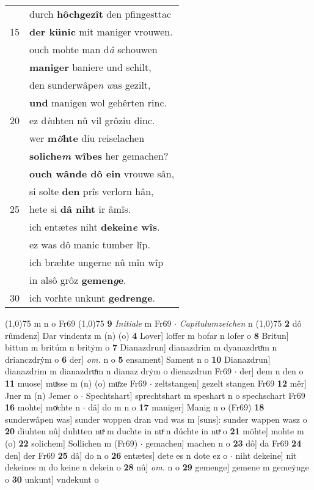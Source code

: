 \documentclass[8pt,a4paper,notitlepage]{article}
\begin{document}
\begin{table}[ht]
\begin{minipage}[t]{0.5\linewidth}
\begin{tabular}{rl}
 & durch \textbf{hôchgezît} den pfingesttac\\ 
15 & \textbf{der künic} mit maniger vrouwen.\\ 
 & ouch mohte man d\textit{â} schouwen\\ 
 & \textbf{maniger} baniere und schilt,\\ 
 & den sunderwâpe\textit{n} \textit{w}as gezilt,\\ 
 & \textbf{und} manigen wol gehêrten rinc.\\ 
20 & ez d\textit{i}uhten nû vil grôziu dinc.\\ 
 & wer \textbf{m\textit{ö}hte} diu reiselachen\\ 
 & \textbf{soliche\textit{m} wîbes} her gemachen?\\ 
 & \textbf{ouch wânde dô ein} vrouwe sân,\\ 
 & si solte \textbf{den} prîs verlorn hân,\\ 
25 & hete si \textbf{dâ niht} ir âmîs.\\ 
 & ich entætes niht \textbf{dekein\textit{e} wîs}.\\ 
 & ez was dô manic tumber lîp.\\ 
 & ich bræhte ungerne nû mîn wîp\\ 
 & in alsô grôz \textbf{gemen\textit{g}e}.\\ 
30 & ich vorhte unkunt \textbf{gedrenge}.\\ 
\end{tabular}
\scriptsize
\line(1,0){75} \newline
m n o Fr69 \newline
\line(1,0){75} \newline
\textbf{9} \textit{Initiale} m Fr69   $\cdot$ \textit{Capitulumzeichen} n  \newline
\line(1,0){75} \newline
\textbf{2} dô rûmdenz] Dar vindentz m (n) (o) \textbf{4} Lover] loffer m bofar n lofer o \textbf{8} Britun] bittun m britúm n britẏm o \textbf{7} Dianazdrun] dianazdrim m dyanazdruͦm n drianczdrẏm o \textbf{6} der] \textit{om.} n o \textbf{5} ensament] Sament n o \textbf{10} Dianazdrun] dianazdrim m dianazdruͦm n dianaz drẏm o dienazdrun Fr69  $\cdot$ der] dem n den o \textbf{11} muose] muͯsse m (n) (o) muͤze Fr69  $\cdot$ zeltstangen] gezelt stangen Fr69 \textbf{12} mêr] Jner m (n) Jemer o  $\cdot$ Spechtshart] sprechtshart m speshart n o spechschart Fr69 \textbf{16} mohte] moͯchte n  $\cdot$ dâ] do m n o \textbf{17} maniger] Manig n o (Fr69) \textbf{18} sunderwâpen was] sunder woppen dran vnd was m [suns]: sunder wappen wasz o \textbf{20} diuhten nû] duhtten nuͯ m duchte in nuͦ n dúchte in nuͯ o \textbf{21} möhte] mohte m (o) \textbf{22} solichem] Sollichen m (Fr69)  $\cdot$ gemachen] machen n o \textbf{23} dô] da Fr69 \textbf{24} den] der Fr69 \textbf{25} dâ] do n o \textbf{26} entætes] dete es n dote ez o  $\cdot$ niht dekeine] nit dekeines m do keine n dekein o \textbf{28} nû] \textit{om.} n o \textbf{29} gemenge] gemene m gemeẏnge o \textbf{30} unkunt] vndekunt o \newline
\end{minipage}
\end{table}
\end{document}
